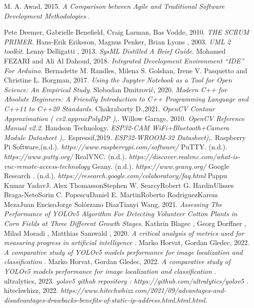\begin{thebibliography}{20}
M. A. Awad, 2015. \emph{A Comparison between Agile and Traditional Software Development Methodologies 
}.

Pete Deemer, Gabrielle Benefield, Craig Larman, Bas Vodde, 2010. \emph{THE
SCRUM PRIMER}.
Hans-Erik Eriksson, Magnus Penker, Brian Lyons
, 2003. \emph{UML 2 toolkit}.
Lenny Delligatti , 2013. \emph{SysML Distilled A Brief Guide}.
 Mohamed FEZARI and Ali Al Dahoud, 2018. \emph{Integrated Development Environment “IDE” For Arduino}.
Bernadette M. Randles, Milena S. Golshan, Irene V. Pasquetto and Christine L. Borgman, 2017. \emph{Using the Jupyter Notebook as a Tool for Open Science: An Empirical Study}.
Slobodan Dmitrović, 2020. \emph{ Modern C++ for Absolute Beginners: A Friendly Introduction to C++ Programming Language and C++11 to C++20 Standards}.
Chakraborty D.,2021. \emph{ OpenCV Contour Approximation ( cv2.approxPolyDP ),}.
Willow Garage, 2010. \emph{OpenCV Reference Manual v2.2}.
Handson Technology. \emph{ ESP32-CAM WiFi+Bluetooth+Camera Module Datasheet ),}.
Espressif,2019. \emph{ ESP32-WROOM-32 Datasheet),}.
Raspberry Pi Software,(n.d.). \emph{https://www.raspberrypi.com/software/}
PuTTY. (n.d.). \emph{ https://www.putty.org/}
RealVNC. (n.d.). \emph{ https://discover.realvnc.com/what-is-vnc-remote-access-technology}
Geany. (n.d.). \emph{https://www.geany.org/}
Google Research . (n.d.). \emph{https://research.google.com/colaboratory/faq.html}
Pappu Kumar YadavJ. Alex ThomassonStephen W. SearcyRobert G. HardinUlisses Braga-NetoSorin C. PopescuDaniel E. MartinRoberto RodriguezKarem MezaJuan EncisoJorge Solórzano DiazTianyi Wang, 2021. \emph{ Assessing The Performance of YOLOv5 Algorithm For Detecting Volunteer Cotton Plants in Corn Fields at Three Different Growth Stages}.
Kathrin Blagec  , Georg Dorffner  , Milad Moradi , Matthias Samwald , 2020. \emph{ A critical analysis of metrics used for measuring progress in artificial intelligence }.
Marko Horvat, Gordan Gledec, 2022. \emph{A comparative study of YOLOv5 models performance for image localization and classification  }.
Marko Horvat, Gordan Gledec, 2022. \emph{A comparative study of YOLOv5 models performance for image localization and classification  }.
ultralytics, 2023. \emph{yolov5 github repository : https://github.com/ultralytics/yolov5 }.
hitechwhizz, 2022. \emph{https://www.hitechwhizz.com/2021/09/advantages-and-disadvantages-drawbacks-benefits-of-static-ip-address.html.html.html}.



\end{thebibliography}
